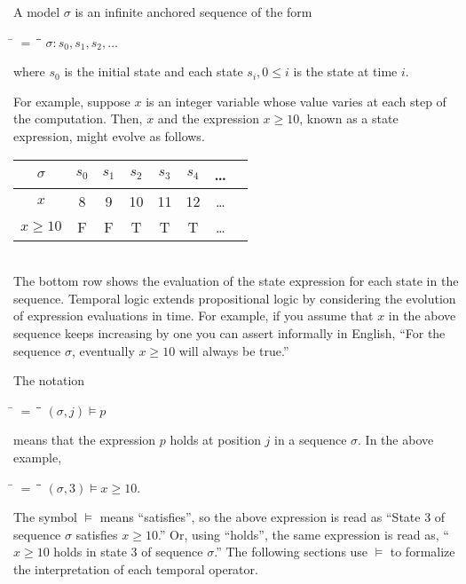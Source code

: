 \documentclass[12pt, fleqn, leqno]{article}
\newcommand{\lllgap}{12pt}                          %
\newcommand{\mymathindent}{24pt}                    %
\newcommand{\myqedtab}{\hspace{384pt}}              %
\begin{document}
A model $\sigma$ is an infinite anchored sequence \cite{Schn} of the form
\begin{tabbing}
\hspace{\mymathindent} \= $= \;$ \= \myqedtab \= \kill
  \> $\sigma: s_0, s_1, s_2, \dots$
\end{tabbing}
where $s_0$ is the initial state and each state $s_i, 0 \le i$ is the state at time $i$.

For example, suppose $x$ is an integer variable whose value varies at each step of the computation.
Then, $x$ and the expression $x\ge 10$, known as a state expression, might evolve as follows.\\[\lllgap]
\begin{tabular}{c|ccccccc}
  $\sigma$      & $s_0$ & $s_1$ & $s_2$ & $s_3$ & $s_4$ & \dots \\
  \hline
  $x$           & 8     & 9     & 10    & 11    & 12    & \dots\\
  $x\ge 10$     & F     & F     & T     & T     & T     & \dots
\end{tabular}\\[\lllgap]
The bottom row shows the evaluation of the state expression for each state in the sequence.
Temporal logic extends propositional logic by considering the evolution of expression evaluations in time.
For example, if you assume that $x$ in the above sequence keeps increasing by one you can assert
informally in English, ``For the sequence $\sigma$, eventually $x\ge 10$ will always be true.''

The notation
\begin{tabbing}
\hspace{\mymathindent} \= $= \;$ \= \myqedtab \= \kill
  \> $(\sigma, j) \models p$
\end{tabbing}
means that the expression $p$ holds at position $j$ in a sequence $\sigma$.
In the above example,
\begin{tabbing}
\hspace{\mymathindent} \= $= \;$ \= \myqedtab \= \kill
  \> $(\sigma, 3) \models x\ge 10$.
\end{tabbing}
The symbol $\models$ means ``satisfies'', so the above expression is read as
``State 3 of sequence $\sigma$ satisfies $x\ge 10$.''
Or, using ``holds'', the same expression is read as, ``$x\ge 10$ holds in state 3 of sequence $\sigma$.''
The following sections use $\models$ to formalize the interpretation of each temporal operator.
\end{document}
